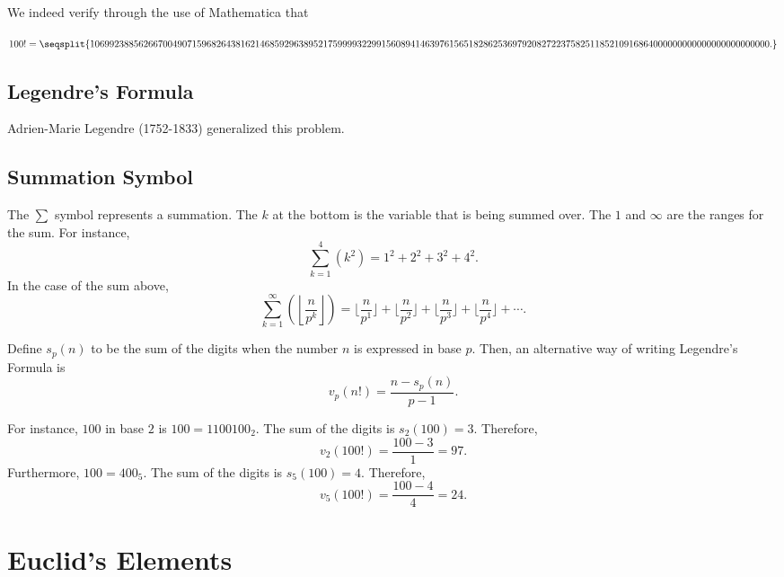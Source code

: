 We indeed verify through the use of Mathematica that

$100!=\seqsplit{%
				10699238856266700490715 96826438162146859296389
				52175999932299156089414
				6397615651828625369792082
				7223758251185210916864
				000000000000000000000000.}$

\clearpage

\subsection{Legendre's Formula}

Adrien-Marie Legendre (1752-1833) generalized this problem.  


\clearpage

\subsection*{Summation Symbol}

The $\sum$ symbol represents a summation. The $k$ at the bottom is the variable that is being summed over. The $1$ and $\infty$ are the ranges for the sum. For instance, $$\sum_{k=1}^{4}(k^2)=1^2+2^2+3^2+4^2.$$  
In the case of the sum above, $$\sum_{k=1}^{\infty}\left(\left\lfloor \frac{n}{p^k} \right\rfloor\right)=\lfloor \frac{n}{p^1}\rfloor+\lfloor \frac{n}{p^2}\rfloor+\lfloor \frac{n}{p^3} \rfloor+\lfloor \frac{n}{p^4} \rfloor+\cdots.$$  

\clearpage 

Define $s_p(n)$ to be the sum of the digits when the number $n$ is expressed in base $p$. Then, an alternative way of writing Legendre's Formula is $$v_p(n!)=\frac{n-s_p(n)}{p-1}.$$  

For instance, $100$ in base $2$ is $100=1100100_2$. The sum of the digits is $s_2(100)=3$. Therefore, $$v_2(100!)=\frac{100-3}{1}=97.$$ 
Furthermore, $100=400_5$. The sum of the digits is $s_5(100)=4$. Therefore, $$v_5(100!)=\frac{100-4}{4}=24.$$

\clearpage

\section{Euclid's Elements}

